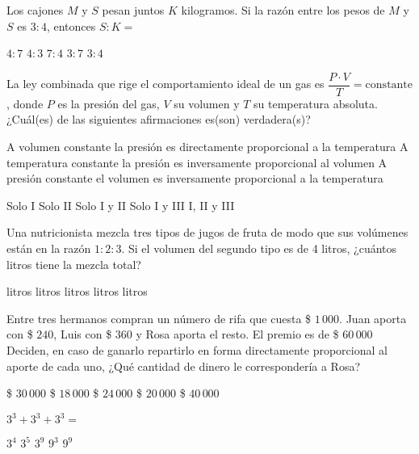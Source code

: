 \documentclass[sin fecha]{srs}
\begin{document}
\begin{preguntas}[after-item-skip=1cm]
\pregunta Los cajones $M$ y $S$ pesan juntos $K$ kilogramos. Si la razón entre los pesos de $M$ y $S$ es $3:4$, entonces $S:K =$
\begin{vertical}
\alternativa $4:7$
\alternativa $4:3$
\alternativa $7:4$
\alternativa $3:7$
\alternativa $3:4$
\end{vertical}

\pregunta La ley combinada que rige el comportamiento ideal de un gas es $\dfrac{P \cdot V}{T} = \text{constante}$, donde $P$ es la presión del gas, $V$ su volumen y $T$ su temperatura absoluta. ¿Cuál(es) de las siguientes afirmaciones es(son) verdadera(s)?
\begin{verticali}
\alternativa A volumen constante la presión es directamente proporcional a la temperatura
\alternativa A temperatura constante la presión es inversamente proporcional al volumen
\alternativa A presión constante el volumen es inversamente proporcional a la temperatura
\end{verticali}
\begin{vertical}
\alternativa Solo I
\alternativa Solo II
\alternativa Solo I y II
\alternativa Solo I y III
\alternativa I, II y III
\end{vertical}

\pregunta Una nutricionista mezcla tres tipos de jugos de fruta de modo que sus volúmenes están en la razón $1:2:3$. Si el volumen del segundo tipo es de 4 litros, ¿cuántos litros tiene la mezcla total?
\begin{vertical}
 litros
 litros
 litros
 litros
 litros
\end{vertical}

\pregunta Entre tres hermanos compran un número de rifa que cuesta \$ $1\,000$. Juan aporta con \$ $240$, Luis con \$ $360$ y Rosa aporta el resto. El premio es de \$ $60\,000$ Deciden, en caso de ganarlo repartirlo en forma directamente proporcional al aporte de cada uno, ¿Qué cantidad de dinero le correspondería a Rosa?
\begin{vertical}
\alternativa \$ $30\,000$
\alternativa \$ $18\,000$
\alternativa \$ $24\,000$
\alternativa \$ $20\,000$
\alternativa \$ $40\,000$
\end{vertical}

\pregunta $3^3 + 3^3 + 3^3 =$
\begin{vertical}
\alternativa $3^4$
\alternativa $3^5$
\alternativa $3^9$
\alternativa $9^3$
\alternativa $9^9$
\end{vertical}


\end{preguntas}
\end{document}
